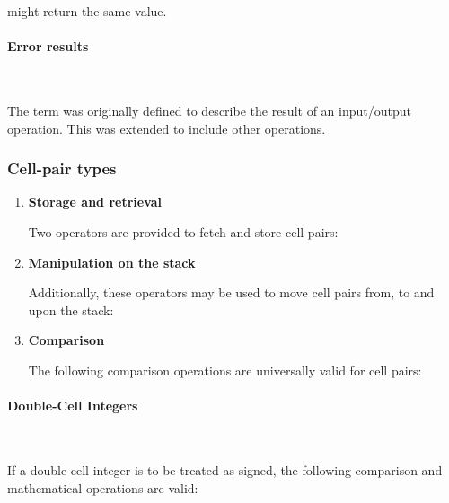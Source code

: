 might return the same value.

\paragraph{Error results} ~ %
\label{rat:ior}

The term  was originally defined to describe the result of
an input/output operation.  This was extended to include other
operations.

\subsubsection{Cell-pair types} %

\begin{enumerate}
\item \textbf{Storage and retrieval}

	Two operators are provided to fetch and store cell pairs:

	\begin{quote}\ttfamily
			
	\end{quote}

\item \textbf{Manipulation on the stack}

	Additionally, these operators may be used to move cell pairs
	from, to and upon the stack:

	\begin{quote}\ttfamily
					
				
	\end{quote}

\item \textbf{Comparison}

	The following comparison operations are universally valid for
	cell pairs:

	\begin{quote}\ttfamily
			
	\end{quote}
\end{enumerate}


\paragraph{Double-Cell Integers} ~ %

If a double-cell integer is to be treated as signed, the following
comparison and mathematical operations are valid:

